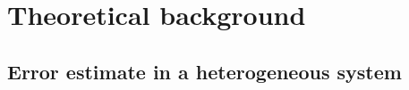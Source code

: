 \documentclass[aps,pre,preprint]{revtex4}
\begin{document}



\section{Theoretical background}
\subsection{Error estimate in a heterogeneous system}
\end{document}
